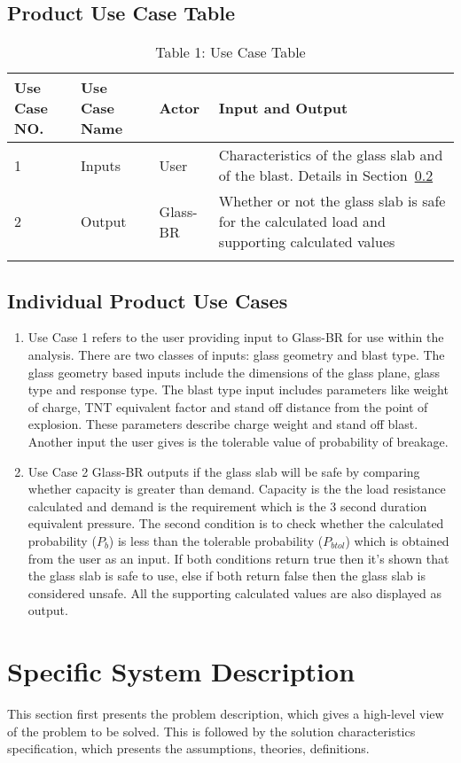 \documentclass[12pt]{article}
\begin{document}
\subsection{Product Use Case Table}
\label{Sec:PUCT}
\begin{longtable}{l l l l}
\toprule
Use Case NO. & Use Case Name & Actor & Input and Output
\\
\midrule
1 & Inputs & User & Characteristics of the glass slab and of the blast. Details in Section~\ref{Sec:IPUC}
\\
2 & Output & Glass-BR & Whether or not the glass slab is safe for the calculated load and supporting calculated values
\\
\bottomrule
\caption{Table 1: Use Case Table}
\label{Table:T1UCT}
\end{longtable}
\subsection{Individual Product Use Cases}
\label{Sec:IPUC}
\begin{enumerate}
\item{Use Case 1 refers to the user providing input to Glass-BR for use within the analysis. There are two classes of inputs: glass geometry and blast type. The glass geometry based inputs include the dimensions of the glass plane, glass type and response type. The blast type input includes parameters like weight of charge, TNT equivalent factor and stand off distance from the point of explosion. These parameters describe charge weight and stand off blast. Another input the user gives is the tolerable value of probability of breakage.}
\item{ Use Case 2 Glass-BR outputs if the glass slab will be safe by comparing whether capacity is greater than demand. Capacity is the the load resistance calculated and demand is the requirement  which is the 3 second duration equivalent pressure. The second condition is to check whether the calculated probability ($P_{b}$) is less than the tolerable probability ($P_{btol}$) which is obtained from the user as an input. If both conditions return true then it's shown that the glass slab is safe to use, else if both return false then the glass slab is considered unsafe. All the supporting calculated values are also displayed as output.}
\end{enumerate}
\section{Specific System Description}
\label{Sec:SSD}
This section first presents the problem description, which gives a high-level view of the problem to be solved. This is followed by the solution characteristics specification, which presents the assumptions, theories, definitions.
\end{document}
